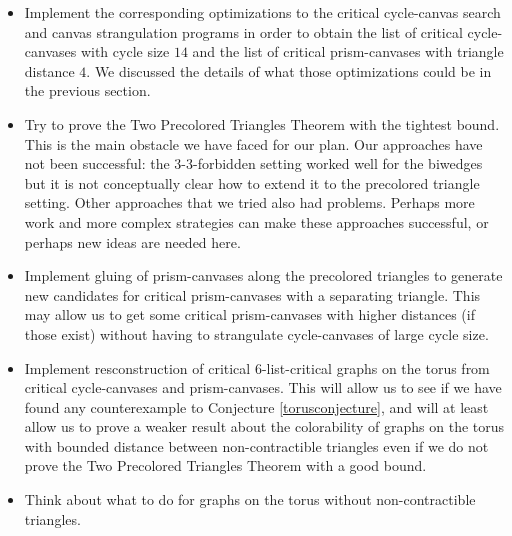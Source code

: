 \begin{itemize}
	\item Implement the corresponding optimizations to the critical cycle-canvas search and
	canvas strangulation programs in order to obtain the list of critical cycle-canvases with
	cycle size $14$ and the list of critical prism-canvases with triangle distance $4$. 
	We discussed the details of what those optimizations could be in the previous 
	section.
	\item Try to prove the Two Precolored Triangles Theorem with the tightest bound. 
	This is the main obstacle we have faced for our plan. 
	Our approaches have not been successful: the 3-3-forbidden
	setting worked well for the biwedges but it is not conceptually clear how to extend
	it to the precolored triangle setting. Other approaches that we tried
	also had problems. Perhaps
	more work and more complex strategies can make these approaches successful, or
	perhaps new ideas are needed here.
	\item Implement gluing of prism-canvases along the precolored triangles to generate
	new candidates for critical prism-canvases with a separating triangle. This may allow
	us to get some critical prism-canvases with higher distances (if those exist) without
	having to strangulate cycle-canvases of large cycle size.
	\item Implement resconstruction of critical $6$-list-critical graphs on the torus
	from critical cycle-canvases and prism-canvases. This will allow us to see if we have
	found any counterexample to Conjecture \ref{torusconjecture}, and will at least allow
	us to prove a weaker result about the colorability of graphs on the torus with bounded
	distance between non-contractible triangles even if we do not prove the Two Precolored
	Triangles Theorem with a good bound. 
	\item Think about what to do for graphs on the torus without non-contractible triangles.
	
\end{itemize}






